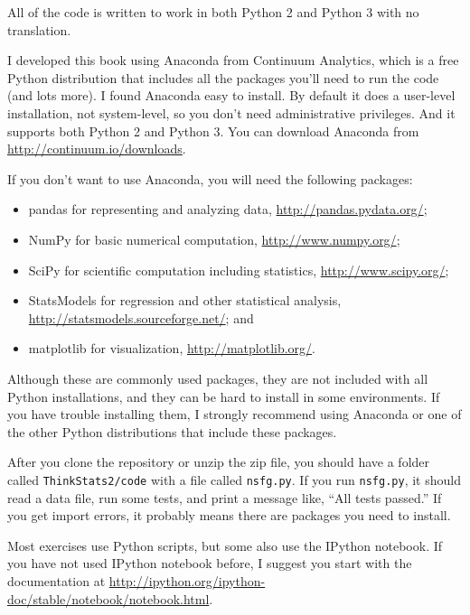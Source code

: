 \documentclass[12pt]{book}
\begin{document}
All of the code is written to work in both Python 2 and Python 3
with no translation.

I developed this book using Anaconda from
Continuum Analytics, which is a free Python distribution that includes
all the packages you'll need to run the code (and lots more).
I found Anaconda easy to install.  By default it does a user-level
installation, not system-level, so you don't need administrative
privileges.  And it supports both Python 2 and Python 3.  You can
download Anaconda from \url{http://continuum.io/downloads}.

If you don't want to use Anaconda, you will need the following
packages:

\begin{itemize}

\item pandas for representing and analyzing data,
  \url{http://pandas.pydata.org/};

\item NumPy for basic numerical computation, \url{http://www.numpy.org/};

\item SciPy for scientific computation including statistics,
  \url{http://www.scipy.org/};

\item StatsModels for regression and other statistical analysis,
\url{http://statsmodels.sourceforge.net/}; and

\item matplotlib for visualization, \url{http://matplotlib.org/}.

\end{itemize}

Although these are commonly used packages, they are not included with
all Python installations, and they can be hard to install in some
environments.  If you have trouble installing them, I strongly
recommend using Anaconda or one of the other Python distributions
that include these packages.

After you clone the repository or unzip the zip file, you should have
a folder called {\tt ThinkStats2/code} with a file called {\tt nsfg.py}.
If you run {\tt nsfg.py}, it should read a data file, run some tests, and print a
message like, ``All tests passed.''  If you get import errors, it
probably means there are packages you need to install.

Most exercises use Python scripts, but some also use the IPython
notebook.  If you have not used IPython notebook before, I suggest
you start with the documentation at
\url{http://ipython.org/ipython-doc/stable/notebook/notebook.html}.
\end{document}
